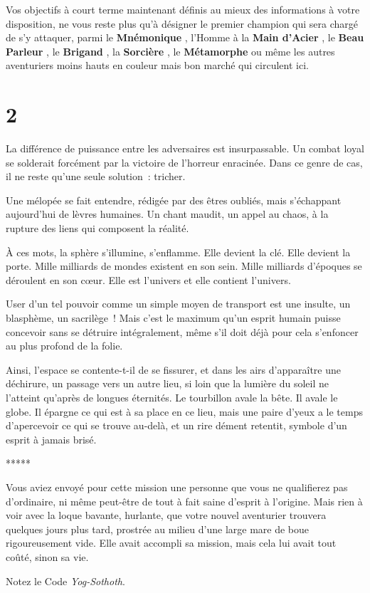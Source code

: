 \documentclass{report}
\newcommand{\gsection}[1]{
    \section{#1}
    \label{section-#1}
}
\newcommand{\ellipse}{
    \begin{center}
        *****
    \end{center}
}
\newcommand{\hero}[1]{
    \textbf{#1}
}
\begin{document}
Vos objectifs à court terme maintenant définis au mieux des informations à votre disposition, ne vous reste plus qu'à désigner le premier champion qui sera chargé de s'y attaquer, parmi le \hero{Mnémonique}, l’Homme à la \hero{Main d’Acier}, le \hero{Beau Parleur}, le \hero{Brigand}, la \hero{Sorcière}, le \hero{Métamorphe} ou même les autres aventuriers moins hauts en couleur mais bon marché qui circulent ici.

\gsection{2}

La différence de puissance entre les adversaires est insurpassable. Un combat loyal se solderait forcément par la victoire de l'horreur enracinée. Dans ce genre de cas, il ne reste qu'une seule solution : tricher.

Une mélopée se fait entendre, rédigée par des êtres oubliés, mais s'échappant aujourd'hui de lèvres humaines. Un chant maudit, un appel au chaos, à la rupture des liens qui composent la réalité.

À ces mots, la sphère s'illumine, s'enflamme. Elle devient la clé. Elle devient la porte. Mille milliards de mondes existent en son sein. Mille milliards d'époques se déroulent en son cœur. Elle est l'univers et elle contient l'univers.

User d'un tel pouvoir comme un simple moyen de transport est une insulte, un blasphème, un sacrilège ! Mais c'est le maximum qu'un esprit humain puisse concevoir sans se détruire intégralement, même s'il doit déjà pour cela s'enfoncer au plus profond de la folie.

Ainsi, l'espace se contente-t-il de se fissurer, et dans les airs d'apparaître une déchirure, un passage vers un autre lieu, si loin que la lumière du soleil ne l'atteint qu'après de longues éternités. Le tourbillon avale la bête. Il avale le globe. Il épargne ce qui est à sa place en ce lieu, mais une paire d'yeux a le temps d'apercevoir ce qui se trouve au-delà, et un rire dément retentit, symbole d'un esprit à jamais brisé.

\ellipse

Vous aviez envoyé pour cette mission une personne que vous ne qualifierez pas d'ordinaire, ni même peut-être de tout à fait saine d'esprit à l'origine. Mais rien à voir avec la loque bavante, hurlante, que votre nouvel aventurier trouvera quelques jours plus tard, prostrée au milieu d'une large mare de boue rigoureusement vide. Elle avait accompli sa mission, mais cela lui avait tout coûté, sinon sa vie.

Notez le Code \emph{Yog-Sothoth}.
\end{document}
